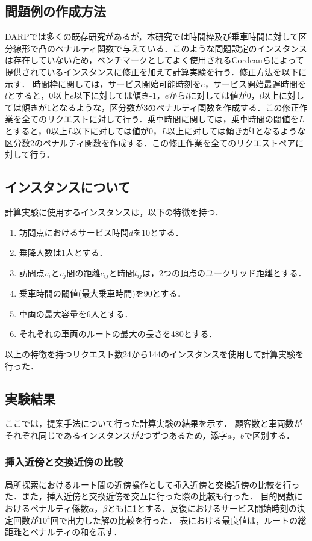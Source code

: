 \documentclass[a4j,11pt,twocolumn]{jsarticle}
\begin{document}
\subsection{問題例の作成方法}
DARPでは多くの既存研究があるが，本研究では時間枠及び乗車時間に対して区分線形で凸のペナルティ関数で与えている．このような問題設定のインスタンスは存在していないため，ベンチマークとしてよく使用されるCordeauらによって提供されている\cite{tabu}インスタンスに修正を加えて計算実験を行う．修正方法を以下に示す．
時間枠に関しては，サービス開始可能時刻を$e$，サービス開始最遅時間を$l$とすると，0以上$e$以下に対しては傾き-1，$e$から$l$に対しては値が0，$l$以上に対しては傾きが1となるような，区分数が3のペナルティ関数を作成する．この修正作業を全てのリクエストに対して行う．乗車時間に関しては，乗車時間の閾値を$L$とすると，0以上$L$以下に対しては値が0，$L$以上に対しては傾きが1となるような区分数2のペナルティ関数を作成する．この修正作業を全てのリクエストペアに対して行う．
\subsection{インスタンスについて}
計算実験に使用するインスタンスは，以下の特徴を持つ．
\begin{enumerate}
 \item 訪問点におけるサービス時間$d$を10とする．
 \item 乗降人数は1人とする．
 \item 訪問点$v_i$と$v_j$間の距離$c_{ij}$と時間$t_{ij}$は，2つの頂点のユークリッド距離とする．
 \item 乗車時間の閾値(最大乗車時間)を90とする．
 \item 車両の最大容量を6人とする．
 \item それぞれの車両のルートの最大の長さを480とする．
\end{enumerate}
以上の特徴を持つリクエスト数24から144のインスタンスを使用して計算実験を行った．

\subsection{実験結果}
ここでは，提案手法について行った計算実験の結果を示す．
顧客数と車両数がそれぞれ同じであるインスタンスが2つずつあるため，添字$a，b$で区別する．

\subsubsection{挿入近傍と交換近傍の比較}
\label{sec:insert}
局所探索におけるルート間の近傍操作として挿入近傍と交換近傍の比較を行った．また，挿入近傍と交換近傍を交互に行った際の比較も行った．
目的関数におけるペナルティ係数$\alpha$，$\beta$ともに1とする．反復におけるサービス開始時刻の決定回数が$10^4$回で出力した解の比較を行った．
表における最良値は，ルートの総距離とペナルティの和を示す．
\end{document}
